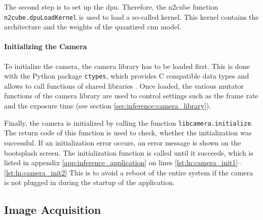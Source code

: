 The second step is to set up the \acrshort{dpu}.
Therefore, the \acrshort{n2cube} function \texttt{n2cube.dpuLoadKernel} is used to load a so-called kernel.
This kernel contains the architecture and the weights of the quantized \acrshort{cnn} model.

\paragraph{Initializing the Camera}
To initialize the camera, the camera library has to be loaded first.
This is done with the Python package \texttt{ctypes}, which provides C compatible data types and allows to call functions of shared libraries \cite{}. %
Once loaded, the various mutator functions of the camera library are used to control settings such as the frame rate and the exposure time (see section \ref{sec:inference:camera_library}).

Finally, the camera is initialized by calling the function \texttt{libcamera.initialize}.
The return code of this function is used to check, whether the initialization was successful.
If an initialization error occurs, an error message is shown on the bootsplash screen.
The initialization function is called until it succeeds, which is listed in appendix \ref{app:inference_application} on lines \ref{lst:ln:camera_init1}--\ref{lst:ln:camera_init2}
This is to avoid a reboot of the entire system if the camera is not plugged in during the startup of the application.

\subsection{Image Acquisition}
\label{subsec:inference:app:image_acquisition}

